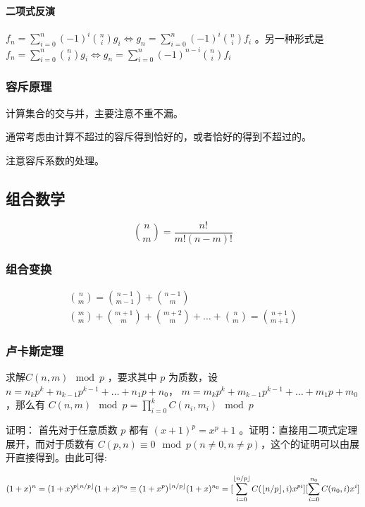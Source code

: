 \documentclass[UTF-8]{ctexart}
\begin{document}
	\paragraph{二项式反演} $f_n = \sum_{i=0}^n (-1)^i {n \choose i} g_i \Leftrightarrow g_n = \sum_{i=0}^n (-1)^i {n \choose i} f_i$ 。另一种形式是 $f_n = \sum_{i=0}^n {n \choose i} g_i \Leftrightarrow g_n = \sum_{i=0}^n (-1)^{n-i} {n \choose i} f_i$
	
	\subsubsection{容斥原理}
	计算集合的交与并，主要注意不重不漏。
	
	通常考虑由计算不超过的容斥得到恰好的，或者恰好的得到不超过的。
	
	注意容斥系数的处理。
	\subsection{组合数学}
	$${n\choose m}=\frac{n!}{m!(n-m)!}$$
	\subsubsection{组合变换}
	\begin{align}
	{n \choose m}={n-1 \choose m-1}+{n-1 \choose m} \nonumber\\
	{m \choose m}+{m+1 \choose m}+{m+2 \choose m}+\dots+{n \choose m}={n+1 \choose m+1}\nonumber
	\end{align}
	\subsubsection{卢卡斯定理}
	求解$C(n,m) \mod{p}$ ，要求其中 $p$ 为质数，设$n=n _ k p ^ k+n _ {k-1} p ^ {k-1}+ \dots+n _ 1 p+n _ 0$， $m=m _ k p ^ k + m _ {k-1} p ^ { k-1} + \dots+m _ 1 p+m _ 0 $ ，那么有 $C(n,m) \mod{p} = \prod _ {i=0} ^ k C(n _ i,m _ i) \mod{p}$
	
	证明：	首先对于任意质数 $p$ 都有 $(x+1) ^ p=x ^ p +1$ 。证明：直接用二项式定理展开，而对于质数有 $C(p,n) \equiv 0 \mod{p} (n \neq0,n \neq p)$，这个的证明可以由展开直接得到。由此可得:  
	
	$$(1+x) ^ n =(1+x) ^ {p \lfloor n/p \rfloor}(1+x) ^ {n _ 0} \\\\ \equiv (1+x ^ p) ^ {\lfloor n/p \rfloor }(1+x) ^ {n _ 0} \\\\ =[\sum _ {i=0} ^ {\lfloor n/p \rfloor} C(\lfloor n/p \rfloor ,i) x ^ {pi}][\sum _ {i=0} ^ {n _ 0} C(n _ 0,i)x ^ i]$$
	
\end{document}

